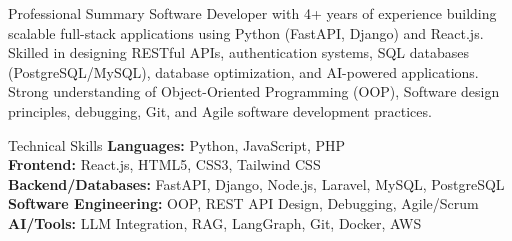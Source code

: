 \documentclass{resume}
\begin{document}
\vspace{0.1em}


\begin{rSection}{Professional Summary}
Software Developer with 4+ years of experience building scalable full-stack applications using Python (FastAPI, Django) and React.js. Skilled in designing RESTful APIs, authentication systems, SQL databases (PostgreSQL/MySQL), database optimization, and AI-powered applications. Strong understanding of Object-Oriented Programming (OOP), Software design principles, debugging, Git, and Agile software development practices.
\end{rSection}

\vspace{-0.1em}
\begin{rSection}{Technical Skills}
\textbf{Languages:} Python, JavaScript, PHP \\
\textbf{Frontend:} React.js, HTML5, CSS3, Tailwind CSS \\
\textbf{Backend/Databases:} FastAPI, Django, Node.js, Laravel, MySQL, PostgreSQL \\
\textbf{Software Engineering:} OOP, REST API Design, Debugging, Agile/Scrum \\
\textbf{AI/Tools:} LLM Integration, RAG, LangGraph, Git, Docker, AWS

\end{rSection}
\end{document}
